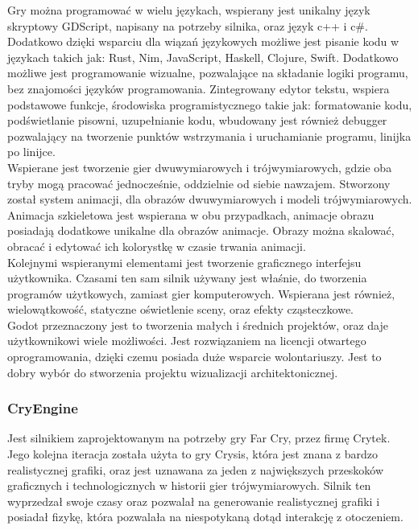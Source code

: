 \documentclass{article} %
\begin{document}
        Gry można programować w wielu językach, wspierany jest unikalny język skryptowy GDScript, napisany na potrzeby silnika, oraz język c++ i c\#. Dodatkowo dzięki wsparciu dla wiązań językowych możliwe jest pisanie kodu w językach takich jak: Rust, Nim, JavaScript, Haskell, Clojure, Swift. Dodatkowo możliwe jest programowanie wizualne, pozwalające na składanie logiki programu, bez znajomości języków programowania. Zintegrowany edytor tekstu, wspiera podstawowe funkcje, środowiska programistycznego takie jak: formatowanie kodu, podświetlanie pisowni, uzupełnianie kodu, wbudowany jest również debugger pozwalający na tworzenie punktów wstrzymania i uruchamianie programu, linijka po linijce.
        \\
        
        Wspierane jest tworzenie gier dwuwymiarowych i trójwymiarowych, gdzie oba tryby mogą pracować jednocześnie, oddzielnie od siebie nawzajem. Stworzony został system animacji, dla obrazów dwuwymiarowych i modeli trójwymiarowych. Animacja szkieletowa jest wspierana w obu przypadkach, animacje obrazu posiadają dodatkowe unikalne dla obrazów animacje. Obrazy można skalować, obracać i edytować ich kolorystkę w czasie trwania animacji. 
        \\
        
        Kolejnymi wspieranymi elementami jest tworzenie graficznego interfejsu użytkownika. Czasami ten sam silnik używany jest właśnie, do tworzenia programów użytkowych, zamiast gier komputerowych. Wspierana jest również, wielowątkowość, statyczne oświetlenie sceny, oraz efekty cząsteczkowe.
        \\
        
        Godot przeznaczony jest to tworzenia małych i średnich projektów, oraz daje użytkownikowi wiele możliwości. Jest rozwiązaniem na licencji otwartego oprogramowania, dzięki czemu posiada duże wsparcie wolontariuszy. Jest to dobry wybór do stworzenia projektu wizualizacji architektonicznej.
        \\
        
        \subsubsection*{CryEngine}
        Jest silnikiem zaprojektowanym na potrzeby gry Far Cry, przez firmę Crytek. Jego kolejna iteracja została użyta to gry Crysis, która jest znana z bardzo realistycznej grafiki, oraz jest uznawana za jeden z największych przeskoków graficznych i technologicznych w historii gier trójwymiarowych. Silnik ten wyprzedzał swoje czasy oraz pozwalał na generowanie realistycznej grafiki i posiadał fizykę, która pozwalała na niespotykaną dotąd interakcję z otoczeniem. 
        \\
        
\end{document}
